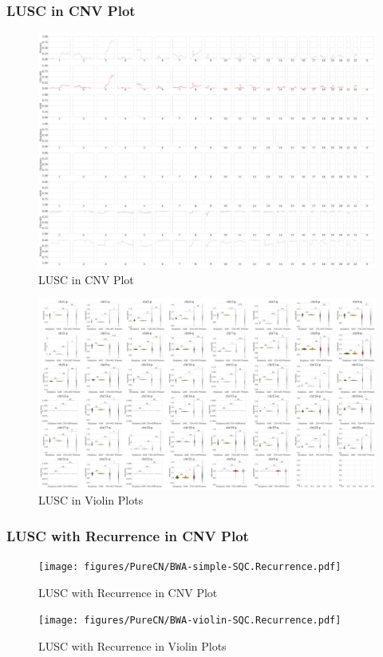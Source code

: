 \documentclass{beamer}
\begin{document}
    \begin{frame}[allowframebreaks]
        \frametitle{LUSC in CNV Plot}

        \begin{figure}
            \includegraphics[width=0.6 \linewidth]{figures/PureCN/BWA-simple-SQC.pdf}
            \caption{LUSC in CNV Plot}
        \end{figure}

        \begin{figure}
            \includegraphics[width=0.8 \linewidth]{figures/PureCN/BWA-violin-SQC.pdf}
            \caption{LUSC in Violin Plots}
        \end{figure}
    \end{frame}

    \begin{frame}[allowframebreaks]
        \frametitle{LUSC with Recurrence in CNV Plot}

        \begin{figure}
            \texttt{[image: figures/PureCN/BWA-simple-SQC.Recurrence.pdf]}
            \caption{LUSC with Recurrence in CNV Plot}
        \end{figure}

        \begin{figure}
            \texttt{[image: figures/PureCN/BWA-violin-SQC.Recurrence.pdf]}
            \caption{LUSC with Recurrence in Violin Plots}
        \end{figure}
    \end{frame}
\end{document}
